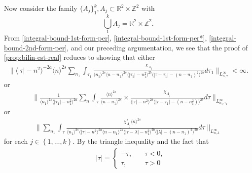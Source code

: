 \documentclass[12pt,reqno]{amsart}
\numberwithin{equation}{section}  %
\newcommand{\rr}{\mathbb{R}}
\newcommand{\zz}{\mathbb{Z}}
\begin{document}
%
%
Now consider the family $\{A_{j}\}_{1}^{k}, A_{j} \subset \rr^{2} \times
\zz^{2}$ with
$$\bigcup_{1}^{k} A_{j}= \rr^{2} \times
\zz^{2}.$$ From \eqref{integral-bound-1st-form-per},
\eqref{integral-bound-1st-form-per*},
\eqref{integral-bound-2nd-form-per}, and our preceding argumentation,
we see that the proof of \cref{prop:bilin-est-real} reduces to showing that
either 
%
%
%
%
\begin{equation}
  \label{key-sup-estimate-per-1}
  \begin{split}
     \| \langle | \tau | - n^{2} \rangle ^{-2a} \langle n
    \rangle ^{2s}
    \sum_{n_{1}}
    \int_{\tau_{1}} \frac{\chi_{A_{j}}}{ \langle n_{1} \rangle ^{2s} \langle
    n-n_{1} \rangle ^{2s} \langle | \tau_{1}|-n_{1}^{2} \rangle^{2b}  \langle  |\tau -
    \tau_{1} | -(n - n_{1})^{2}
    \rangle^{2b}  } d \tau_1  \|_{L^\infty_{n, \tau}} < \infty.
  \end{split}
\end{equation}
%
or
\begin{equation}
  \label{key-sup-estimate-per-2}
\begin{split}
  & \| \frac{1}{\langle n_{1} \rangle ^{2s}
  \langle | \tau_{1} | - n_{1}^{2} \rangle
  ^{2a}} \sum_{n} \int_{\tau} \frac{\langle n \rangle ^{2s}}{\langle
  n - n_{1}\rangle ^{2s}}  \times \frac{\chi_{A_{j}}}{\langle | \tau | - n^{2}
  \rangle^{2b}  \langle | \tau -
  \tau_{1} | - (n - n_{1}^{2}) \rangle^{2b} } d \tau 
  \|_{L^{\infty}_{n_{1}, \tau_{1}}}
\end{split}
\end{equation}
or
%
%
\begin{equation}
  \label{key-sup-estimate-per-3}
\begin{split}
  \| \sum_{n_{1}} \int_{\tau} \frac{\chi^{*}_{A_{j}}
    \langle n \rangle ^{2s}
    }{ \langle n_{1} \rangle^{2s} \langle | \tau | - n^{2}
    \rangle ^{2a}  \langle
n-n_{1} \rangle ^{2s}  \langle | \tau - \lambda|-n_{1}^{2}
\rangle^{2b} \langle  | \lambda | -(n - n_{1})^{2}
\rangle^{2b} } d \tau  \|_{L^{\infty}_{n, \lambda}}
\end{split}
\end{equation}
%
%
for each $j \in \left\{ 1,\dots,k \right\}$. 
By the triangle inequality and the fact that 
%
%
\begin{equation*}
\begin{split}
& | \tau | =
\begin{cases}
  - \tau, \quad & \tau < 0, 
\\
\tau, \quad & \tau > 0
\end{cases}
\end{split}
\end{equation*}
\end{document}
